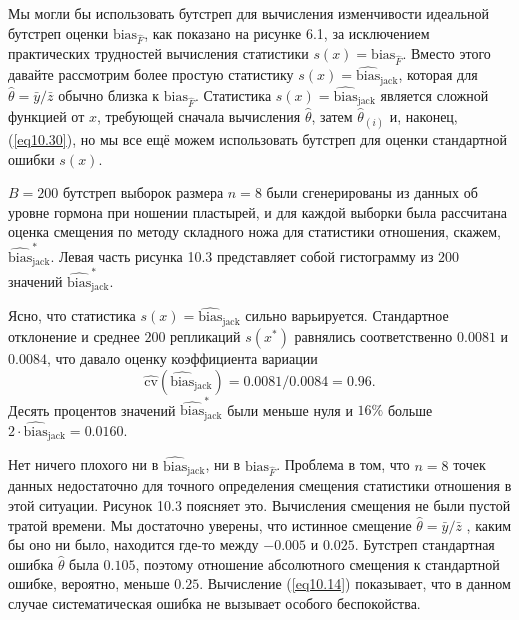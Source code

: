 Мы могли бы использовать бутстреп для вычисления изменчивости идеальной бутстреп оценки $\text{bias}_{\hat{F}}$, как показано на рисунке 6.1, за исключением практических трудностей вычисления статистики $s(x) = \text{bias}_{\hat{F}}$. Вместо этого давайте рассмотрим более простую статистику $s(x) = \widehat{\text{bias}}_{\text{jack}}$, которая для $\hat{\theta} = \bar{y}/\bar{z}$ обычно близка к $\text{bias}_{\hat{F}}$. Статистика $s(x) = \widehat{\text{bias}}_{\text{jack}}$ является сложной функцией от $x$, требующей сначала вычисления $\hat{\theta}$, затем $\hat{\theta}_{(i)}$ и, наконец, (\ref{eq10.30}), но мы все ещё можем использовать бутстреп для оценки стандартной ошибки $s(x)$.

$B = 200$ бутстреп выборок размера $n = 8$ были сгенерированы из данных об уровне гормона при ношении пластырей, и для каждой выборки была рассчитана оценка смещения по методу складного ножа для статистики отношения, скажем, $\widehat{\text{bias}}_{\text{jack}}^{*}$. Левая часть рисунка 10.3 представляет собой гистограмму из $200$ значений $\widehat{\text{bias}}_{\text{jack}}^{*}$.

Ясно, что статистика $s(x) = \widehat{\text{bias}}_{\text{jack}}$ сильно варьируется. Стандартное отклонение и среднее $200$ репликаций $s(x^{*})$ равнялись соответственно $0.0081$ и $0.0084$, что давало оценку коэффициента вариации 
\begin{equation}\label{eq10.33}
    \widehat{\text{cv}}(\widehat{\text{bias}}_{\text{jack}}) = 0.0081/0.0084 = 0.96.
\end{equation}
Десять процентов значений $\widehat{\text{bias}}_{\text{jack}}^{*}$ были меньше нуля и $16\%$ больше $2\cdot \widehat{\text{bias}}_{\text{jack}} = 0.0160$.

Нет ничего плохого ни в $\widehat{\text{bias}}_{\text{jack}}$, ни в $\text{bias}_{\hat{F}}$. Проблема в том, что $n = 8$ точек данных недостаточно для точного определения смещения статистики отношения в этой ситуации. Рисунок 10.3 поясняет это. Вычисления смещения не были пустой тратой времени. Мы достаточно уверены, что истинное смещение $\hat{\theta} = \bar{y}/\bar{z}$ , каким бы оно ни было, находится где-то между $-0.005$ и $0.025$. Бутстреп стандартная ошибка $\hat{\theta}$ была $0.105$, поэтому отношение абсолютного смещения к стандартной ошибке, вероятно, меньше $0.25$. Вычисление (\ref{eq10.14}) показывает, что в данном случае систематическая ошибка не вызывает особого беспокойства.

